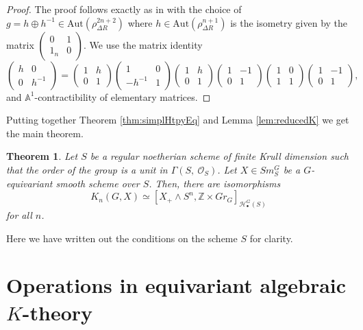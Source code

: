 \documentclass[11pt,twoside]{amsart}
\newtheorem{theorem}{Theorem}[section]
\theoremstyle{definition}
\theoremstyle{remark}
\numberwithin{equation}{section}
\newcommand{\mc}{\mathcal}
\newcommand{\ZZ}{\mathbb{Z}}
\begin{document}
\begin{proof} The proof follows exactly as in \cite[Lemma 6]{ST15} with the choice of $g=h\oplus h^{-1}\in \mathrm{Aut}(\rho^{2n+2}_{\Delta R})$ where $h\in \mathrm{Aut}(\rho^{n+1}_{\Delta R})$ is the isometry given by the matrix
$\left( \begin{smallmatrix} 0 & 1 \\ 1_{n} & 0\end{smallmatrix}\right)$.  
We use the matrix identity
$$
\left(\begin{smallmatrix}h&0\\ 0&h^{-1}\end{smallmatrix}\right)=
\left(\begin{smallmatrix}1&h\\ 0&1\end{smallmatrix}\right)
\left(\begin{smallmatrix}1&0\\ -h^{-1}&1\end{smallmatrix}\right)
\left(\begin{smallmatrix}1&h\\ 0&1\end{smallmatrix}\right)
\left(\begin{smallmatrix}1&-1\\ 0&1\end{smallmatrix}\right)
\left(\begin{smallmatrix}1&0\\ 1&1\end{smallmatrix}\right)
\left(\begin{smallmatrix}1&-1\\ 0&1\end{smallmatrix}\right),
$$
and $\mathbb{A}^1$-contractibility of elementary matrices.
\end{proof}

Putting together Theorem \ref{thm:simplHtpyEq}  and Lemma \ref{lem:reducedK} we get the main theorem.
\begin{theorem}
	\label{thm:MT} 
	Let $S$ be a regular noetherian scheme of finite Krull dimension such that the order of the group is a unit in $\Gamma(S,\ \mc{O}_S)$. Let $X\in Sm^G_S$ be a $G$-equivariant smooth scheme over $S$. Then,  there are isomorphisms
	\[K_n(G, X) \simeq [ X_{+} \wedge S^n, \ZZ\times Gr_G]_{\mc{H}_\bullet^G(S)} \] for all $n$.
\end{theorem}
Here we have written out the conditions on the scheme $S$ for clarity.
\section{Operations in equivariant algebraic \texorpdfstring{$K$}{K}-theory}
\end{document}
